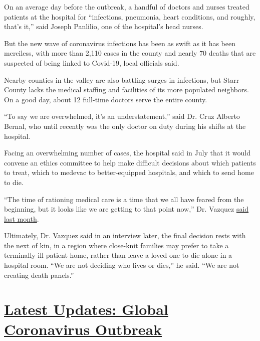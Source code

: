 On an average day before the outbreak, a handful of doctors and nurses
treated patients at the hospital for ``infections, pneumonia, heart
conditions, and roughly, that's it,'' said Joseph Panlilio, one of the
hospital's head nurses.

But the new wave of coronavirus infections has been as swift as it has
been merciless, with more than 2,110 cases in the county and nearly 70
deaths that are suspected of being linked to Covid-19, local officials
said.

Nearby counties in the valley are also battling surges in infections,
but Starr County lacks the medical staffing and facilities of its more
populated neighbors. On a good day, about 12 full-time doctors serve the
entire county.

``To say we are overwhelmed, it's an understatement,'' said Dr. Cruz
Alberto Bernal, who until recently was the only doctor on duty during
his shifts at the hospital.

Facing an overwhelming number of cases, the hospital said in July that
it would convene an ethics committee to help make difficult decisions
about which patients to treat, which to medevac to better-equipped
hospitals, and which to send home to die.

``The time of rationing medical care is a time that we all have feared
from the beginning, but it looks like we are getting to that point
now,'' Dr. Vazquez
\href{https://www.themonitor.com/2020/07/19/starr-county-form-ethics-committee-responsible-virus-resources/}{said
last month}.

Ultimately, Dr. Vazquez said in an interview later, the final decision
rests with the next of kin, in a region where close-knit families may
prefer to take a terminally ill patient home, rather than leave a loved
one to die alone in a hospital room. ``We are not deciding who lives or
dies,'' he said. ``We are not creating death panels.''

\hypertarget{latest-updates-global-coronavirus-outbreak}{%
\section{\texorpdfstring{\href{https://www.nytimes.com/2020/08/04/world/coronavirus-cases.html?action=click\&pgtype=Article\&state=default\&region=MAIN_CONTENT_1\&context=storylines_live_updates}{Latest
Updates: Global Coronavirus
Outbreak}}{Latest Updates: Global Coronavirus Outbreak}}\label{latest-updates-global-coronavirus-outbreak}}

